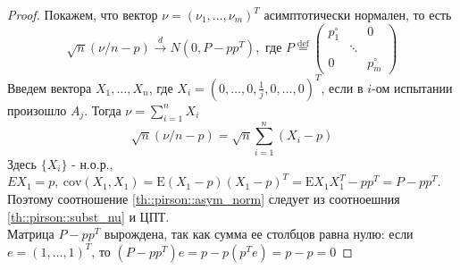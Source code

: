 \documentclass[12pt]{article}
\theoremstyle{basic_theorem}
\theoremstyle{name_theorem}
\newcommand*{\defeq}{\stackrel{\text{def}}{=}}
\def\cov{ \mathrm{cov} }
\def\E{ \mathrm{E} }
\begin{document}
\begin{proof}
    Покажем, что вектор $\nu=(\nu_1,\ldots,\nu_m)^T$ асимптотически нормален, то есть
    \begin{equation}\label{th::pirson::asym_norm}
        \sqrt{n}(\nu/n-p)\xrightarrow{d}N(0,P-pp^T),\text{ где }P\defeq\begin{pmatrix}
            p_1^\circ & & 0 \\
                & \ddots & \\
            0 & & p_m^\circ
        \end{pmatrix}
    \end{equation}
    Введем вектора $X_1,\ldots,X_n$, где $X_i=(0,\ldots,0,\frac{1}{j},0,\ldots,0)^T$,
    если в $i$-ом испытании произошло $A_j$. Тогда $\nu=\sum_{i=1}^nX_i$
    \begin{equation}\label{th::pirson::subst_nu}
        \sqrt{n}(\nu/n-p)=\sqrt{n}\sum_{i=1}^n(X_i-p)
    \end{equation}
    Здесь $\{X_i\}$ - н.о.р., $EX_1=p,\ \cov(X_1,X_1)=\E(X_1-p)(X_1-p)^T=\E X_1X_1^T-pp^T=P-pp^T$.
    Поэтому соотношение \eqref{th::pirson::asym_norm} следует из соотноешния \eqref{th::pirson::subst_nu}
    и ЦПТ. \\
    Матрица $P-pp^T$ вырождена, так как сумма ее столбцов равна нулю:
    если $e=(1,\ldots,1)^T$, то $(P-pp^T)e=p-p(p^Te)=p-p=0$


\end{proof}
\end{document}
